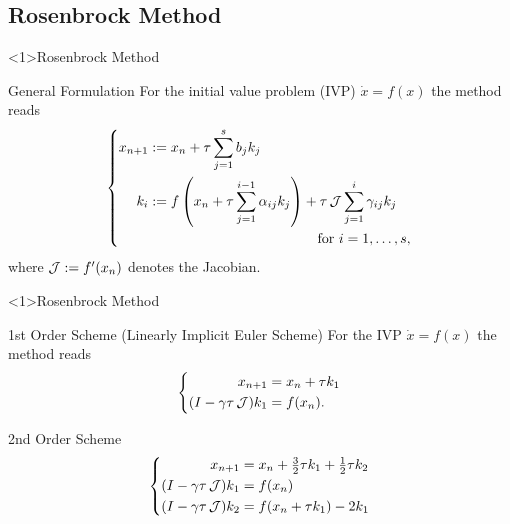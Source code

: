 \subsection{Rosenbrock Method}

\begin{frame}<1>{Rosenbrock Method}
\begin{bigpicturecols}
  \begin{block}{General Formulation}
    For the initial value problem (IVP) $\dot x = f(x)$ the method reads
    \begin{equation*}
    \left\{
    \begin{aligned}
      x_{n+1} &:= x_n + \tau \sum_{j=1}^s b_j k_j
      \\
      k_i &:= \begin{multlined}[t]
      f\left( x_n + \tau \sum_{j=1}^{i-1} \alpha_{ij} k_j \right) + \tau \Jac \sum_{j=1}^i \gamma_{ij} k_j
      \\
      \text{for } i = 1, \ldots, s
      ,
      \end{multlined}
    \end{aligned}
    \right.
    \end{equation*}
    where $\operatorname{\mathcal J} := f'(x_n)$ denotes the Jacobian.
  \end{block}
\column{\bigpicturewidth}
\end{bigpicturecols}
\end{frame}

\begin{frame}<1>{Rosenbrock Method}
\begin{bigpicturecols}
  \begin{block}{1st Order Scheme (Linearly Implicit Euler Scheme)}
    For the IVP $\dot x = f(x)$ the method reads
    \begin{equation*}
    \left\{
    \begin{aligned}
      x_{n+1} &= x_n + \tau k_1 \\
      (I - \gamma\tau \operatorname{\mathcal J}) k_1 &= f(x_n)
      .
    \end{aligned}
    \right.
    \end{equation*}
  \end{block}
  \begin{block}{2nd Order Scheme \parencite{Verwer1999}}
    \begin{equation*}
    \left\{
    \begin{aligned}
      x_{n+1} &= x_n + \tfrac{3}{2} \tau k_1 + \tfrac{1}{2} \tau k_2 \\
      (I - \gamma\tau \operatorname{\mathcal J}) k_1 &= f(x_n) \\
      (I - \gamma\tau \operatorname{\mathcal J}) k_2 &= f(x_n + \tau k_1) - 2k_1
    \end{aligned}
    \right.
    \end{equation*}
  \end{block}
\column{\bigpicturewidth}
\end{bigpicturecols}
\end{frame}

